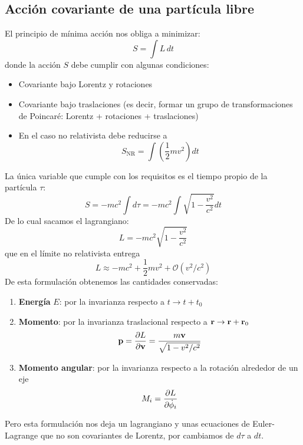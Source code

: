 \documentclass[]{article}
\numberwithin{equation}{section}
\begin{document}
\subsection{Acción covariante de una partícula libre}
El principio de mínima acción nos obliga a minimizar:
\begin{equation*}
	S = \int L \, dt
\end{equation*}
donde la acción \(S\) debe cumplir con algunas condiciones:
\begin{itemize}
	\item Covariante bajo Lorentz y rotaciones
	\item Covariante bajo traslaciones
	(es decir, formar un grupo de transformaciones de Poincaré: Lorentz + rotaciones + traslaciones)
	\item En el caso no relativista debe reducirse a
	\begin{equation*}
		S_{\mathrm{NR}} = \int \left(\frac{1}{2} mv^2\right) dt
	\end{equation*}
\end{itemize}
La única variable que cumple con los requisitos es el tiempo propio de la partícula \(\tau\):
\begin{equation}
	S = -mc^2 \int d\tau = -mc^2 \int \sqrt{1 - \frac{v^2}{c^2}} dt
\end{equation}
De lo cual sacamos el lagrangiano:
\begin{equation}
	L = -m c^2 \sqrt{1 - \frac{v^2}{c^2}}
\end{equation}
que en el límite no relativista entrega
\begin{equation*}
	L \approx -mc^2 + \frac{1}{2}m v^2 + \mathcal{O}(v^2/c^2)
\end{equation*}
De esta formulación obtenemos las cantidades conservadas:
\begin{enumerate}
	\item \textbf{Energía} \(E\): por la invarianza respecto a \(t \rightarrow t + t_{0}\)
	\item \textbf{Momento}: por la invarianza traslacional respecto a \(\mathbf{r} \rightarrow \mathbf{r} + \mathbf{r}_{0}\)
	\begin{equation*}
		\mathbf{p} = \dfrac{\partial L}{\partial \mathbf{v}} = \frac{m\mathbf{v}}{\sqrt{1 - v^2/c^2}}
	\end{equation*}
	\item \textbf{Momento angular}: por la invarianza respecto a la rotación alrededor de un eje
	\begin{equation*}
		M_{i} = \dfrac{\partial L}{\partial \dot{\phi}_{i}}
	\end{equation*}
\end{enumerate}
Pero esta formulación nos deja un lagrangiano y unas ecuaciones de Euler-Lagrange que no son covariantes de Lorentz, por cambiamos de \(d\tau\) a \(dt\).
\end{document}
